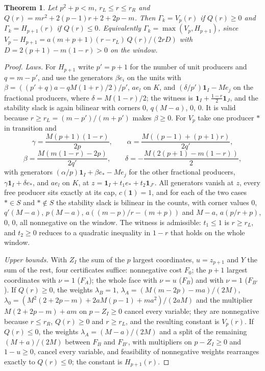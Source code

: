\documentclass[11pt,a4paper]{article}
\newtheorem{theorem}{Theorem}
\theoremstyle{remark}
\newcommand{\one}{\mathbf 1}
\begin{document}
\begin{theorem}\label{thm:windows}
Let $p^2+p<m$, $r_L\le r\le r_R$ and $Q(r)=mr^2+2(p-1)r+2+2p-m$. Then
$\Gamma_k=V_p(r)$ if $Q(r)\ge0$ and $\Gamma_k=H_{p+1}(r)$ if $Q(r)\le0$.
Equivalently $\Gamma_k=\max(V_p,H_{p+1})$, since
$V_p-H_{p+1}=a(m+p+1)(r-r_L)\,Q(r)/(2rD)$ with $D=2(p+1)-m(1-r)>0$ on the
window.
\end{theorem}

\begin{proof}
\emph{Laws.} For $H_{p+1}$ write $p'=p+1$ for the number of unit producers
and $q=m-p'$, and use the generators $\beta e_i$ on the units with
$\beta=((p'+q)a-qM(1+r)/2)/p'$, $ae_l$ on $K$, and $(\delta/p')\one_I-Me_j$ on
the fractional producers, where $\delta=M(1-r)/2$; the witness is
$\one_I+\frac{1-r}2\one_J$, and the stability slack is again bilinear with
corners $0$, $q(M-a)$, $0$, $0$. It is valid because
$r\ge r_L=(m-p')/(m+p')$ makes $\beta\ge0$. For $V_p$ take one
producer $*$ in transition and
\[
\gamma=\frac{M(p+1)(1-r)}{2p},\qquad
\alpha=\frac{M((p-1)+(p+1)r)}{2q'},
\]
\[
\beta=\frac{M(m(1-r)-2p)}{2q'},\qquad
\delta=-\frac{M(2(p+1)-m(1-r))}{2},
\]
with generators $(\alpha/p)\one_I+\beta e_*-Me_j$ for the other fractional
producers, $\gamma\one_I+\delta e_*$, and $ae_l$ on $K$, at
$z=\one_I+t_1e_*+t_2\one_{J'}$. All generators vanish at $z$, every free
producer sits exactly at its cap, $c(\one)=1$, and for each of the two cases
$*\in S$ and $*\notin S$ the stability slack is bilinear in the counts, with
corner values $0$, $q'(M-a)$, $p(M-a)$, $a((m-p)/r-(m+p))$ and $M-a$,
$a(p/r+p)$, $0$, $0$, all nonnegative on the window. The witness is
admissible: $t_1\le1$ is $r\ge r_L$, and $t_2\ge0$ reduces to a quadratic
inequality in $1-r$ that holds on the whole window.

\emph{Upper bounds.} With $Z_I$ the sum of the $p$ largest coordinates,
$u=z_{p+1}$ and $Y$ the sum of the rest, four certificates suffice:
nonnegative cost $F_0$; the $p+1$ largest coordinates with $\nu=1$ ($F_A$);
the whole face with $\nu=u$ ($F_B$) and with $\nu=1$ ($F_{B'}$). If
$Q(r)\ge0$, the weights $\lambda_B=1$,
$\lambda_A=(M(m-2p)-ma)/(2M)$,
$\lambda_0=(M^2(2+2p-m)+2aM(p-1)+ma^2)/(2aM)$ and the multiplier
$M(2+2p-m)+am$ on $p-Z_I\ge0$ cancel every variable; they are nonnegative
because $r\le r_R$, $Q(r)\ge0$ and $r\ge r_L$, and the resulting constant is
$V_p(r)$. If $Q(r)\le0$, the weights $\lambda_A=(M-a)/(2M)$ and a split of the
remaining $(M+a)/(2M)$ between $F_B$ and $F_{B'}$, with multipliers on
$p-Z_I\ge0$ and $1-u\ge0$, cancel every variable, and feasibility of
nonnegative weights rearranges exactly to $Q(r)\le0$; the constant is
$H_{p+1}(r)$.
\end{proof}
\end{document}
